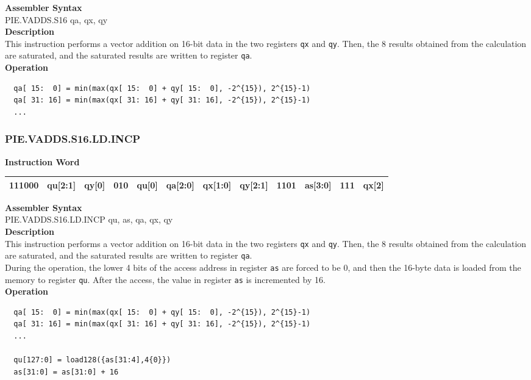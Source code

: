 \textbf{Assembler Syntax} \\
PIE.VADDS.S16 qa, qx, qy \\
\textbf{Description} \\
This instruction performs a vector addition on 16-bit data in the two registers \lstinline{qx} and \lstinline{qy}. Then, the 8 results obtained from the calculation are saturated, and the saturated results are written to register \lstinline{qa}.\\
\textbf{Operation}
\begin{lstlisting}
  qa[ 15:  0] = min(max(qx[ 15:  0] + qy[ 15:  0], -2^{15}), 2^{15}-1)
  qa[ 31: 16] = min(max(qx[ 31: 16] + qy[ 31: 16], -2^{15}), 2^{15}-1)
  ...
\end{lstlisting}

\newpage
\subsubsection{PIE.VADDS.S16.LD.INCP}\label{instruction:PIEVADDSS16LDINCP}
\setlength\tabcolsep{6pt}
\textbf{Instruction Word} \\
\begin{tabular}{|c|c|c|c|c|c|c|c|c|c|c|c|}
	\hline
	111000 & qu[2:1] & qy[0] & 010 & qu[0] & qa[2:0] & qx[1:0] & qy[2:1] & 1101 & as[3:0] & 111 & qx[2] \\
	\hline
\end{tabular}

\textbf{Assembler Syntax} \\
PIE.VADDS.S16.LD.INCP qu, as, qa, qx, qy \\
\textbf{Description} \\
This instruction performs a vector addition on 16-bit data in the two registers \lstinline{qx} and \lstinline{qy}. Then, the 8 results obtained from the calculation are saturated, and the saturated results are written to register \lstinline{qa}. \\ During the operation, the lower 4 bits of the access address in register \lstinline{as} are forced to be 0, and then the 16-byte data is loaded from the memory to register \lstinline{qu}. After the access, the value in register \lstinline{as} is incremented by 16.\\
\textbf{Operation}
\begin{lstlisting}
  qa[ 15:  0] = min(max(qx[ 15:  0] + qy[ 15:  0], -2^{15}), 2^{15}-1)
  qa[ 31: 16] = min(max(qx[ 31: 16] + qy[ 31: 16], -2^{15}), 2^{15}-1)
  ...

  qu[127:0] = load128({as[31:4],4{0}})
  as[31:0] = as[31:0] + 16
\end{lstlisting}

